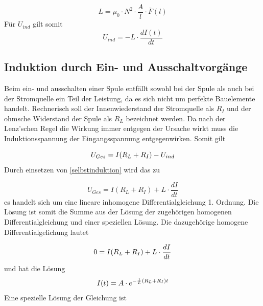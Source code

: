 \documentclass{article}
\begin{document}
\begin{equation}
L = \mu_0 \cdot N^2 \cdot \frac{A}{l} \cdot  \bar{F}(l)
\label{selbstinduktionkoeff}
\end{equation}
\noindent
Für \(U_{ind}\) gilt somit
\begin{equation}
U_{ind} = -L \cdot \frac{dI(t)}{dt}
\label{selbstinduktion}
\end{equation}

\newpage

\subsection{Induktion durch Ein- und Ausschaltvorgänge}
Beim ein- und ausschalten einer Spule entfällt sowohl bei der Spule als auch bei der Stromquelle ein Teil der Leistung, da es sich nicht um perfekte Bauelemente handelt. Rechnerisch soll der Innenwiederstand der Stromquelle als \(R_I\) und der ohmsche Widerstand der Spule als \(R_L\) bezeichnet werden. Da nach der {\sc Lenz'schen Regel} die Wirkung immer entgegen der Ursache wirkt  muss die Induktionsspannung der Eingangsspannung entgegenwirken. Somit gilt

\begin{equation}
U_{Ges} = I(R_L+R_I) - U_{ind}
\notag
\end{equation}
\noindent
Durch einsetzen von \eqref{selbstinduktion} wird das zu

\begin{equation}
U_{Ges} = I(R_L+R_I) + L \cdot \frac{dI}{dt}
\label{einaus_dgl}
\end{equation}
\noindent
es handelt sich um eine lineare inhomogene Differentialgleichung 1. Ordnung.
Die Lösung ist somit die Summe aus der Lösung der zugehörigen homogenen Differentialgleichung und einer speziellen Lösung. Die dazugehörige homogene Differentialgelichung lautet

\begin{equation}
0 = I(R_L+R_I) + L \cdot \frac{dI}{dt}
\notag
\end{equation}
\noindent
und hat die Lösung
\begin{equation}
I(t) = A \cdot e^{-\frac{1}{L}(R_L+R_I)t}
\notag
\end{equation}
\noindent
Eine spezielle Lösung der Gleichung ist
\end{document}
